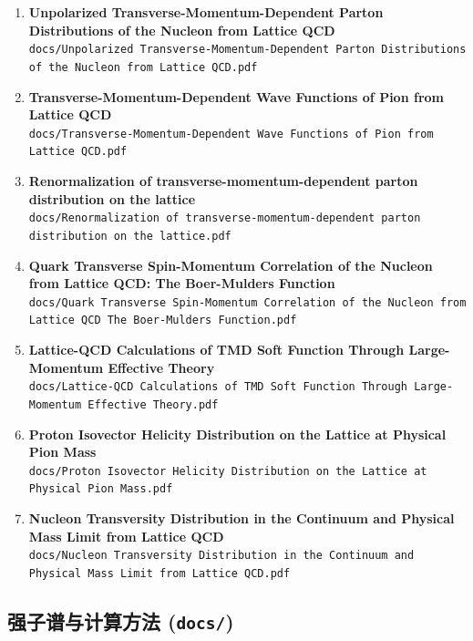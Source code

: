 \documentclass[12pt,a4paper]{ctexart}
\begin{document}
\begin{enumerate}
    \item \textbf{Unpolarized Transverse-Momentum-Dependent Parton Distributions of the Nucleon from Lattice QCD} \\
    \texttt{docs/Unpolarized Transverse-Momentum-Dependent Parton Distributions of the Nucleon from Lattice QCD.pdf}

    \item \textbf{Transverse-Momentum-Dependent Wave Functions of Pion from Lattice QCD} \\
    \texttt{docs/Transverse-Momentum-Dependent Wave Functions of Pion from Lattice QCD.pdf}

    \item \textbf{Renormalization of transverse-momentum-dependent parton distribution on the lattice} \\
    \texttt{docs/Renormalization of transverse-momentum-dependent parton distribution on the lattice.pdf}

    \item \textbf{Quark Transverse Spin-Momentum Correlation of the Nucleon from Lattice QCD: The Boer-Mulders Function} \\
    \texttt{docs/Quark Transverse Spin-Momentum Correlation of the Nucleon from Lattice QCD The Boer-Mulders Function.pdf}

    \item \textbf{Lattice-QCD Calculations of TMD Soft Function Through Large-Momentum Effective Theory} \\
    \texttt{docs/Lattice-QCD Calculations of TMD Soft Function Through Large-Momentum Effective Theory.pdf}

    \item \textbf{Proton Isovector Helicity Distribution on the Lattice at Physical Pion Mass} \\
    \texttt{docs/Proton Isovector Helicity Distribution on the Lattice at Physical Pion Mass.pdf}

    \item \textbf{Nucleon Transversity Distribution in the Continuum and Physical Mass Limit from Lattice QCD} \\
    \texttt{docs/Nucleon Transversity Distribution in the Continuum and Physical Mass Limit from Lattice QCD.pdf}
\end{enumerate}

\subsection{强子谱与计算方法 (\texttt{docs/})}
\end{document}
